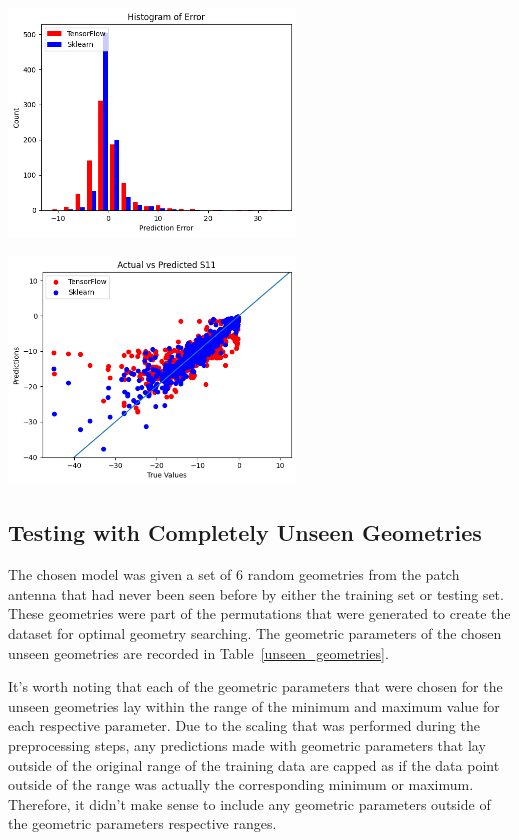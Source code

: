 \documentclass[lettersize,journal]{IEEEtran}
\newenvironment{Figure}
    {\par\medskip\noindent\minipage{\linewidth}}
    {\endminipage\par\medskip}
\begin{document}
\begin{Figure}
    \centering
    \includegraphics[width=3in]{histogram_leaky_wave}
    \label{histogram_of_error_leaky_wave}
\end{Figure}

\begin{Figure}
    \centering
    \includegraphics[width=3in]{actual_vs_predicted_s11_leaky_wave}
    \label{actual_vs_predicted_s11_leaky_wave}
\end{Figure}

\subsection{Testing with Completely Unseen Geometries}
The chosen model was given a set of 6 random geometries from the patch antenna that had never been seen before by either the training set or testing set. These geometries were part of the permutations that were generated to create the dataset for optimal geometry searching. The geometric parameters of the chosen unseen geometries are recorded in Table~\ref{unseen_geometries}.

It's worth noting that each of the geometric parameters that were chosen for the unseen geometries lay within the range of the minimum and maximum value for each respective parameter. Due to the scaling that was performed during the preprocessing steps, any predictions made with geometric parameters that lay outside of the original range of the training data are capped as if the data point outside of the range was actually the corresponding minimum or maximum. Therefore, it didn't make sense to include any geometric parameters outside of the geometric parameters respective ranges. 
\end{document}
